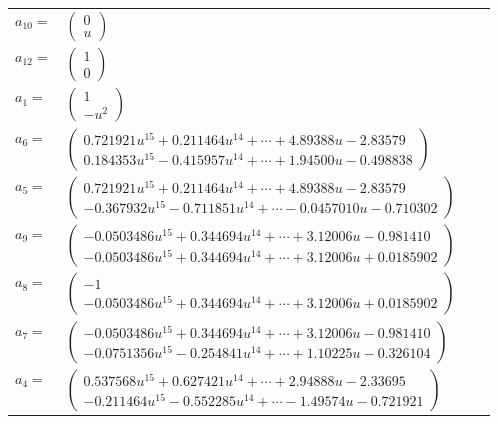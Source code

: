 \documentclass[1p]{elsarticle_modified}
\theoremstyle{definition}
\begin{document}
\begin{tabular}{m{7pt} m{180pt} m{7pt} m{180pt} }
\flushright $a_{10}=$&$\begin{pmatrix}0\\u\end{pmatrix}$ \\
\flushright $a_{12}=$&$\begin{pmatrix}1\\0\end{pmatrix}$ \\
\flushright $a_{1}=$&$\begin{pmatrix}1\\- u^2\end{pmatrix}$ \\
\flushright $a_{6}=$&$\begin{pmatrix}0.721921 u^{15}+0.211464 u^{14}+\cdots+4.89388 u-2.83579\\0.184353 u^{15}-0.415957 u^{14}+\cdots+1.94500 u-0.498838\end{pmatrix}$ \\
\flushright $a_{5}=$&$\begin{pmatrix}0.721921 u^{15}+0.211464 u^{14}+\cdots+4.89388 u-2.83579\\-0.367932 u^{15}-0.711851 u^{14}+\cdots-0.0457010 u-0.710302\end{pmatrix}$ \\
\flushright $a_{9}=$&$\begin{pmatrix}-0.0503486 u^{15}+0.344694 u^{14}+\cdots+3.12006 u-0.981410\\-0.0503486 u^{15}+0.344694 u^{14}+\cdots+3.12006 u+0.0185902\end{pmatrix}$ \\
\flushright $a_{8}=$&$\begin{pmatrix}-1\\-0.0503486 u^{15}+0.344694 u^{14}+\cdots+3.12006 u+0.0185902\end{pmatrix}$ \\
\flushright $a_{7}=$&$\begin{pmatrix}-0.0503486 u^{15}+0.344694 u^{14}+\cdots+3.12006 u-0.981410\\-0.0751356 u^{15}-0.254841 u^{14}+\cdots+1.10225 u-0.326104\end{pmatrix}$ \\
\flushright $a_{4}=$&$\begin{pmatrix}0.537568 u^{15}+0.627421 u^{14}+\cdots+2.94888 u-2.33695\\-0.211464 u^{15}-0.552285 u^{14}+\cdots-1.49574 u-0.721921\end{pmatrix}$ \\

\end{tabular}
\end{document}
